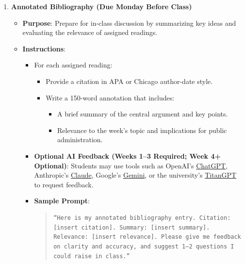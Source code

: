 \documentclass[12pt]{article}     %
\begin{document}
\begin{enumerate}
    \item \textbf{Annotated Bibliography (Due Monday Before Class)}
    \begin{itemize}
        \item \textbf{Purpose}: Prepare for in-class discussion by summarizing key ideas and evaluating the relevance of assigned readings.
        \item \textbf{Instructions}:
        \begin{itemize}
            \item For each assigned reading:
            \begin{itemize}
                \item Provide a citation in APA or Chicago author-date style.
                \item Write a 150-word annotation that includes:
                \begin{itemize}
                    \item A brief summary of the central argument and key points.
                    \item Relevance to the week's topic and implications for public administration.
                \end{itemize}
            \end{itemize}
            \item \textbf{Optional AI Feedback (Weeks 1--3 Required; Week 4+ Optional)}: Students may use tools such as OpenAI's \href{https://chat.openai.com/}{ChatGPT}, Anthropic's \href{https://www.anthropic.com/}{Claude}, Google's \href{https://www.google.com/search/about/}{Gemini}, or the university's \href{https://titangpt.fullerton.edu/auth/jwt/login}{TitanGPT} to request feedback.  
            \item \textbf{Sample Prompt}:
            \begin{quote}
                \texttt{``Here is my annotated bibliography entry. Citation: [insert citation]. Summary: [insert summary]. Relevance: [insert relevance]. Please give me feedback on clarity and accuracy, and suggest 1--2 questions I could raise in class.''}
            \end{quote}
        \end{itemize}
    \end{itemize}


\end{enumerate}
\end{document}
